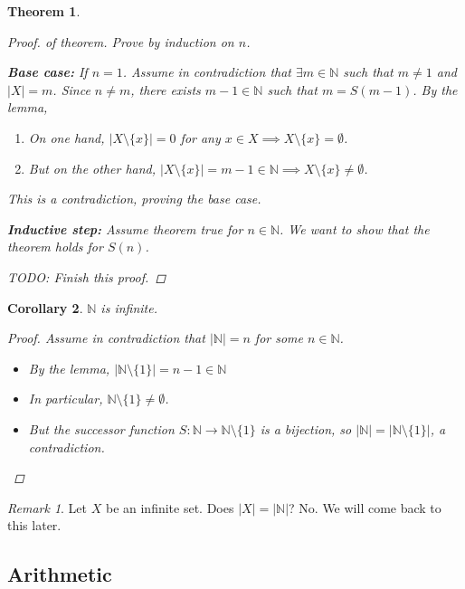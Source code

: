 \documentclass[10pt]{article}
\newcommand{\N}{\mathbb{N}}
\newcommand{\abs}[1]{\left| #1 \right|}
\newtheorem{theorem}{Theorem}[section]
\newtheorem{corollary}[theorem]{Corollary}
\theoremstyle{definition}
\theoremstyle{remark}
\newtheorem*{remark}{Remark}
\begin{document}
\begin{theorem}
    \begin{proof}
        of theorem. Prove by induction on $n$.

        \textbf{Base case:}
        If $n = 1$. Assume in contradiction that $\exists m \in \N$ such that $m \neq 1$ and $\abs{X} = m$.
        Since $n \neq m$, there exists $m -1 \in \N$ such that $m = S(m - 1)$.
        By the lemma,
        \begin{enumerate}
            \item On one hand, $\abs{X \setminus \{x\}} = 0$ for any $x \in X \implies X \setminus \{x\} = \emptyset$.
            \item But on the other hand, $\abs{X \setminus \{x\}} = m - 1 \in \N \implies X \setminus \{x\} \neq \emptyset$.
        \end{enumerate}
        This is a contradiction, proving the base case.

        \textbf{Inductive step:} Assume theorem true for $n \in \N$. We want to show that the theorem holds for $S(n)$.

        TODO: Finish this proof.
    \end{proof}
\end{theorem}

\begin{corollary}
    $\N$ is infinite.
    \begin{proof}
        Assume in contradiction that $\abs{\N} = n$ for some $n \in \N$. 
        \begin{itemize}
            \item
            By the lemma, $\abs{\N \setminus \{1\}} = n - 1 \in \N$
            \item
            In particular, $\N \setminus \{1\} \neq \emptyset$.
            \item
            But the successor function $S: \N \to \N \setminus \{1\}$ is a bijection, so $\abs{\N} = \abs{\N \setminus \{1\}}$, a contradiction.
        \end{itemize}
    \end{proof}
\end{corollary}

\begin{remark}
    Let $X$ be an infinite set. Does $\abs{X} = \abs{\N}$? No. We will come back to this later.
\end{remark}

\subsection{Arithmetic}
\end{document}
